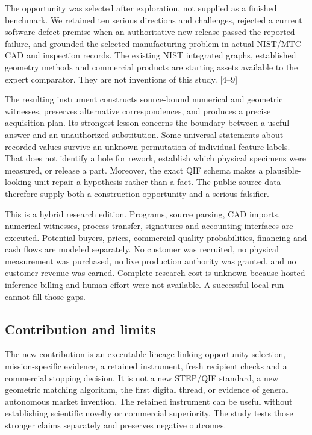 \documentclass[
  11pt,
]{article}
\let\OriginalSubsection\subsection
\renewcommand{\subsection}{\needspace{6\baselineskip}\OriginalSubsection}
\begin{document}
The opportunity was selected after exploration, not supplied as a
finished benchmark. We retained ten serious directions and challenges,
rejected a current software-defect premise when an authoritative new
release passed the reported failure, and grounded the selected
manufacturing problem in actual NIST/MTC CAD and inspection records. The
existing NIST integrated graphs, established geometry methods and
commercial products are starting assets available to the expert
comparator. They are not inventions of this study. {[}4--9{]}

The resulting instrument constructs source-bound numerical and geometric
witnesses, preserves alternative correspondences, and produces a precise
acquisition plan. Its strongest lesson concerns the boundary between a
useful answer and an unauthorized substitution. Some universal
statements about recorded values survive an unknown permutation of
individual feature labels. That does not identify a hole for rework,
establish which physical specimens were measured, or release a part.
Moreover, the exact QIF schema makes a plausible-looking unit repair a
hypothesis rather than a fact. The public source data therefore supply
both a construction opportunity and a serious falsifier.

This is a hybrid research edition. Programs, source parsing, CAD
imports, numerical witnesses, process transfer, signatures and
accounting interfaces are executed. Potential buyers, prices, commercial
quality probabilities, financing and cash flows are modeled separately.
No customer was recruited, no physical measurement was purchased, no
live production authority was granted, and no customer revenue was
earned. Complete research cost is unknown because hosted inference
billing and human effort were not available. A successful local run
cannot fill those gaps.

\hypertarget{contribution-and-limits}{%
\subsection{Contribution and limits}\label{contribution-and-limits}}

The new contribution is an executable lineage linking opportunity
selection, mission-specific evidence, a retained instrument, fresh
recipient checks and a commercial stopping decision. It is not a new
STEP/QIF standard, a new geometric matching algorithm, the first digital
thread, or evidence of general autonomous market invention. The retained
instrument can be useful without establishing scientific novelty or
commercial superiority. The study tests those stronger claims separately
and preserves negative outcomes.
\end{document}
